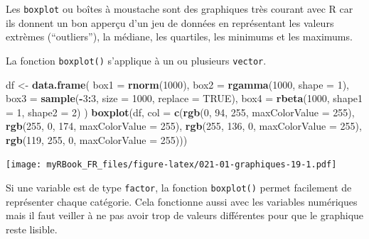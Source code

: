 \documentclass[]{book}
\newenvironment{Shaded}{\begin{snugshade}}{\end{snugshade}}
\newcommand{\DataTypeTok}[1]{\textcolor[rgb]{0.13,0.29,0.53}{#1}}
\newcommand{\DecValTok}[1]{\textcolor[rgb]{0.00,0.00,0.81}{#1}}
\newcommand{\KeywordTok}[1]{\textcolor[rgb]{0.13,0.29,0.53}{\textbf{#1}}}
\newcommand{\NormalTok}[1]{#1}
\newcommand{\OperatorTok}[1]{\textcolor[rgb]{0.81,0.36,0.00}{\textbf{#1}}}
\newcommand{\OtherTok}[1]{\textcolor[rgb]{0.56,0.35,0.01}{#1}}
\newcommand{\StringTok}[1]{\textcolor[rgb]{0.31,0.60,0.02}{#1}}
\begin{document}
Les \texttt{boxplot} ou boîtes à moustache sont des graphiques très courant avec R car ils donnent un bon apperçu d'un jeu de données en représentant les valeurs extrèmes (``outliers''), la médiane, les quartiles, les minimums et les maximums.

La fonction \texttt{boxplot()} s'applique à un ou plusieurs \texttt{vector}.

\begin{Shaded}
\begin{Highlighting}[]
\NormalTok{df <-}\StringTok{ }\KeywordTok{data.frame}\NormalTok{(}
  \DataTypeTok{box1 =} \KeywordTok{rnorm}\NormalTok{(}\DecValTok{1000}\NormalTok{), }
  \DataTypeTok{box2 =} \KeywordTok{rgamma}\NormalTok{(}\DecValTok{1000}\NormalTok{, }\DataTypeTok{shape =} \DecValTok{1}\NormalTok{), }
  \DataTypeTok{box3 =} \KeywordTok{sample}\NormalTok{(}\OperatorTok{-}\DecValTok{3}\OperatorTok{:}\DecValTok{3}\NormalTok{, }\DataTypeTok{size =} \DecValTok{1000}\NormalTok{, }\DataTypeTok{replace =} \OtherTok{TRUE}\NormalTok{),}
  \DataTypeTok{box4 =} \KeywordTok{rbeta}\NormalTok{(}\DecValTok{1000}\NormalTok{, }\DataTypeTok{shape1 =} \DecValTok{1}\NormalTok{, }\DataTypeTok{shape2 =} \DecValTok{2}\NormalTok{)}
\NormalTok{)}
\KeywordTok{boxplot}\NormalTok{(df, }\DataTypeTok{col =} \KeywordTok{c}\NormalTok{(}\KeywordTok{rgb}\NormalTok{(}\DecValTok{0}\NormalTok{, }\DecValTok{94}\NormalTok{, }\DecValTok{255}\NormalTok{, }\DataTypeTok{maxColorValue =} \DecValTok{255}\NormalTok{),  }
  \KeywordTok{rgb}\NormalTok{(}\DecValTok{255}\NormalTok{, }\DecValTok{0}\NormalTok{, }\DecValTok{174}\NormalTok{, }\DataTypeTok{maxColorValue =} \DecValTok{255}\NormalTok{),  }
  \KeywordTok{rgb}\NormalTok{(}\DecValTok{255}\NormalTok{, }\DecValTok{136}\NormalTok{, }\DecValTok{0}\NormalTok{, }\DataTypeTok{maxColorValue =} \DecValTok{255}\NormalTok{),  }
  \KeywordTok{rgb}\NormalTok{(}\DecValTok{119}\NormalTok{, }\DecValTok{255}\NormalTok{, }\DecValTok{0}\NormalTok{, }\DataTypeTok{maxColorValue =} \DecValTok{255}\NormalTok{)))}
\end{Highlighting}
\end{Shaded}

\texttt{[image: myRBook\_FR\_files/figure-latex/021-01-graphiques-19-1.pdf]}

Si une variable est de type \texttt{factor}, la fonction \texttt{boxplot()} permet facilement de représenter chaque catégorie. Cela fonctionne aussi avec les variables numériques mais il faut veiller à ne pas avoir trop de valeurs différentes pour que le graphique reste lisible.
\end{document}
